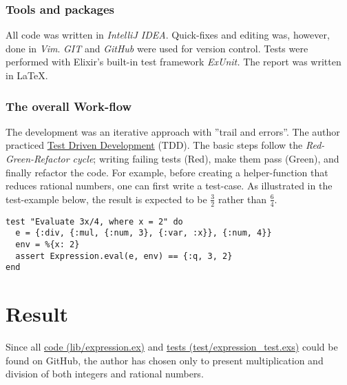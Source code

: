 \documentclass[a4paper,11pt]{article}
\begin{document}
\subsubsection*{Tools and packages}
\label{subsec:tools}
All code was written in \emph{IntelliJ IDEA}.
Quick-fixes and editing was, however, done in \emph{Vim}.
\emph{GIT} and \emph{GitHub} were used for version control.
Tests were performed with Elixir's built-in test framework \emph{ExUnit.}
The report was written in \LaTeX.
\subsubsection*{The overall Work-flow}
\label{subsec:workflow}
The development was an iterative approach with ''trail and errors''.
The author practiced
\href{https://www.elixirwiki.com/wiki/Test-Driven_Development_in_Elixir}{Test Driven Development}
(TDD).
The basic steps follow the \emph{Red-Green-Refactor cycle};
writing failing tests (Red), make them pass (Green),
and finally refactor the code.
For example, before creating a helper-function that reduces rational numbers,
one can first write a test-case.
As illustrated in the test-example below, the result is expected to be
$\frac{3}{2}$ rather than $\frac{6}{4}$.
\begin{verbatim}
test "Evaluate 3x/4, where x = 2" do
  e = {:div, {:mul, {:num, 3}, {:var, :x}}, {:num, 4}}
  env = %{x: 2}
  assert Expression.eval(e, env) == {:q, 3, 2}
end
\end{verbatim}
\section*{Result}
\label{sec:result}
Since all
\href{https://github.com/VincentFerrigan/kth-id1019-programming-ii/tree/main/tasks/3/expression/lib/expression.ex}{code (lib/expression.ex)} and %
\href{https://github.com/VincentFerrigan/kth-id1019-programming-ii/tree/main/tasks/3/expression/test/expression_test.exs}{tests (test/expression\_test.exs)}
could be found on GitHub, the author has chosen only to present multiplication and division
of both integers and rational numbers.
\end{document}
